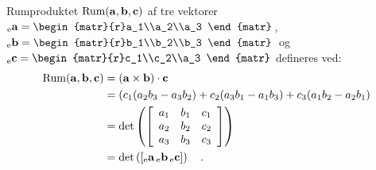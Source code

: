 \begin{definition}[Rumprodukt]\label{rumprodukt}
 Rumproduktet $\operatorname{Rum}(\mathbf{a}, \mathbf{b}, \mathbf{c})$ af tre vektorer
 ${_\mathrm{e}\mathbf{a}}=\begin{matr}{r}a_1\\a_2\\a_3 \end{matr}\,$, 
 ${_\mathrm{e}\mathbf{b}}=\begin{matr}{r}b_1\\b_2\\b_3 \end{matr}\,$ og
 ${_\mathrm{e}\mathbf{c}}=\begin{matr}{r}c_1\\c_2\\a_3 \end{matr}$
defineres ved:
 \begin{equation} \label{tn6.eqRumProd}
 \begin{aligned}
 \operatorname{Rum}(\mathbf{a}, \mathbf{b}, \mathbf{c}) &= (\mathbf{a} \times \mathbf{b})\cdot \mathbf{c}\\
 &= (c_{1}(a_{2}b_{3}-a_{3}b_{2}) + c_{2}(a_{3}b_{1}-a_{1}b_{3})+ c_{3}( a_{1}b_{2}-a_{2}b_{1}) \\
 &= \det\left( \left[
                 \begin{array}{rrr}
                   a_{1} & b_{1} & c_{1} \\
                   a_{2} & b_{2} & c_{2} \\
                   a_{3} & b_{3} & c_{3} \\
                 \end{array}
               \right]
  \right) \\
  &= \det\left( \left[{_\mathrm{e}\mathbf{a}} \, {_\mathrm{e}\mathbf{b}} \, {_\mathrm{e}\mathbf{c}}
               \right]
  \right)\quad.
 \end{aligned}
 \end{equation}
 \end{definition}
 
